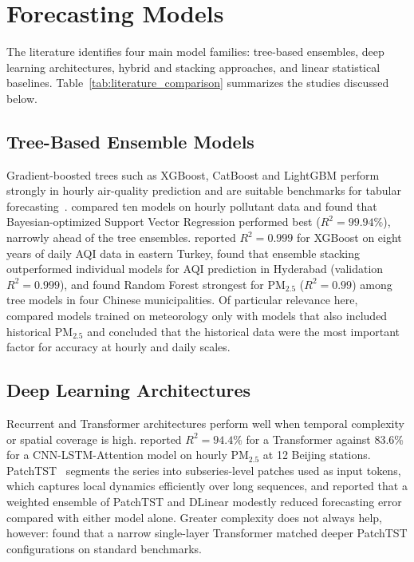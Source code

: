 \section{Forecasting Models}
\label{section:Forecasting Models}
The literature identifies four main model families: tree-based ensembles, deep learning architectures, hybrid and stacking approaches, and linear statistical baselines. Table~\ref{tab:literature_comparison} summarizes the studies discussed below.

\subsection{Tree-Based Ensemble Models}
Gradient-boosted trees such as XGBoost, CatBoost and LightGBM perform strongly in hourly air-quality prediction and are suitable benchmarks for tabular forecasting~\parencite{singh2026}. \textcite{ozupak2025} compared ten models on hourly pollutant data and found that Bayesian-optimized Support Vector Regression performed best ($R^2 = 99.94\%$), narrowly ahead of the tree ensembles. \textcite{tirinck2025} reported $R^2 = 0.999$ for XGBoost on eight years of daily AQI data in eastern Turkey, \textcite{ravindiran2025} found that ensemble stacking outperformed individual models for AQI prediction in Hyderabad (validation $R^2 = 0.999$), and \textcite{zhu2026} found Random Forest strongest for PM$_{2.5}$ ($R^2 = 0.99$) among tree models in four Chinese municipalities. Of particular relevance here, \textcite{kang2023} compared models trained on meteorology only with models that also included historical PM$_{2.5}$ and concluded that the historical data were the most important factor for accuracy at hourly and daily scales.

\subsection{Deep Learning Architectures}
Recurrent and Transformer architectures perform well when temporal complexity or spatial coverage is high. \textcite{cui2023} reported $R^2 = 94.4\%$ for a Transformer against 83.6\% for a CNN-LSTM-Attention model on hourly PM$_{2.5}$ at 12 Beijing stations. PatchTST~\parencite{nie2023} segments the series into subseries-level patches used as input tokens, which captures local dynamics efficiently over long sequences, and \textcite{fan2025} reported that a weighted ensemble of PatchTST and DLinear modestly reduced forecasting error compared with either model alone. Greater complexity does not always help, however: \textcite{yildirim2026} found that a narrow single-layer Transformer matched deeper PatchTST configurations on standard benchmarks.

